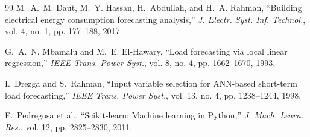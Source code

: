 \documentclass[11pt,letterpaper]{article}
\begin{document}
\begin{thebibliography}{99}
M.~A.~M. Daut, M.~Y. Hassan, H.~Abdullah, and H.~A. Rahman, ``Building electrical energy consumption forecasting analysis,'' \emph{J. Electr. Syst. Inf. Technol.}, vol. 4, no. 1, pp. 177--188, 2017.

G.~A.~N. Mbamalu and M.~E. El-Hawary, ``Load forecasting via local linear regression,'' \emph{IEEE Trans. Power Syst.}, vol. 8, no. 4, pp. 1662--1670, 1993.

I.~Drezga and S.~Rahman, ``Input variable selection for ANN-based short-term load forecasting,'' \emph{IEEE Trans. Power Syst.}, vol. 13, no. 4, pp. 1238--1244, 1998.

F.~Pedregosa et al., ``Scikit-learn: Machine learning in Python,'' \emph{J. Mach. Learn. Res.}, vol. 12, pp. 2825--2830, 2011.

\end{thebibliography}
\end{document}
